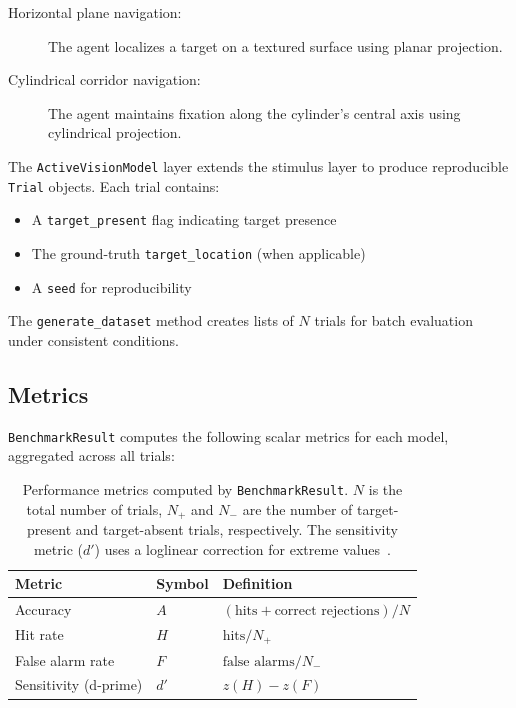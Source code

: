 \documentclass[12pt,a4paper]{article}
\newcommand{\dprime}{$d'$}
\begin{document}
\begin{description}
  \item[Horizontal plane navigation:] The agent localizes a target on a textured surface using planar projection.
  \item[Cylindrical corridor navigation:] The agent maintains fixation along the cylinder's central axis using cylindrical projection.
\end{description}

The \texttt{ActiveVisionModel} layer extends the stimulus layer to produce reproducible \texttt{Trial} objects. Each trial contains:
\begin{itemize}
    \item A \texttt{target\_present} flag indicating target presence
    \item The ground-truth \texttt{target\_location} (when applicable)
    \item A \texttt{seed} for reproducibility
\end{itemize}
The \texttt{generate\_dataset} method creates lists of $N$ trials for batch evaluation under consistent conditions.

\subsection{Metrics}
\label{sec:metrics}
\texttt{BenchmarkResult} computes the following scalar metrics for each model, aggregated across all trials:

\begin{table}[htbp]
\centering
\caption{
  Performance metrics computed by \texttt{BenchmarkResult}.
  $N$ is the total number of trials, $N_+$ and $N_-$ are the number of target-present and target-absent trials, respectively.
  The sensitivity metric ($d'$) uses a loglinear correction for extreme values~\parencite{Hautus1995}.
}
\label{tab:metrics}
\begin{tabular}{lll}
\toprule
\textbf{Metric}               & \textbf{Symbol} & \textbf{Definition} \\
\midrule
Accuracy                    & $A$             & $(\text{hits} + \text{correct rejections}) / N$ \\
Hit rate                    & $H$             & $\text{hits} / N_+$ \\
False alarm rate            & $F$             & $\text{false alarms} / N_-$ \\
Sensitivity (d-prime)       & \dprime         & $z(H) - z(F)$ \\
\bottomrule
\end{tabular}
\end{table}
\end{document}
